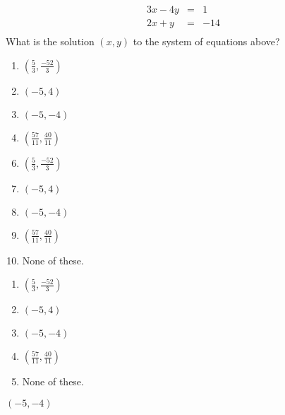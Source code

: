  
\begin{eqnarray*}
3x-4y&=&1\\
2x+y&=&-14\\
\end{eqnarray*}
What is the solution $(x,y)$ to the system of equations above?


\ifsat
	\begin{enumerate}[label=\Alph*)]
		\item $\left(\frac{5}{3},\frac{-52}{3}\right) $
		\item $(-5,4) $
		\item $(-5,-4) $ %
		\item $\left(\frac{57}{11},\frac{40}{11}\right) $
	\end{enumerate}
\else
\fi

\ifacteven
	\begin{enumerate}[label=\textbf{\Alph*.},itemsep=\fill,align=left]
		\setcounter{enumii}{5}
		\item $\left(\frac{5}{3},\frac{-52}{3}\right) $
		\item $(-5,4) $
		\item $(-5,-4) $ %
		\addtocounter{enumii}{1}
		\item $\left(\frac{57}{11},\frac{40}{11}\right) $
		\item None of these. 
	\end{enumerate}
\else
\fi

\ifactodd
	\begin{enumerate}[label=\textbf{\Alph*.},itemsep=\fill,align=left]
		\item $\left(\frac{5}{3},\frac{-52}{3}\right) $
		\item $(-5,4) $
		\item $(-5,-4) $ %
		\item $\left(\frac{57}{11},\frac{40}{11}\right) $
		\item None of these. 
	\end{enumerate}
\else
\fi

\ifgridin
 $(-5,-4) $ %
		
\else
\fi

